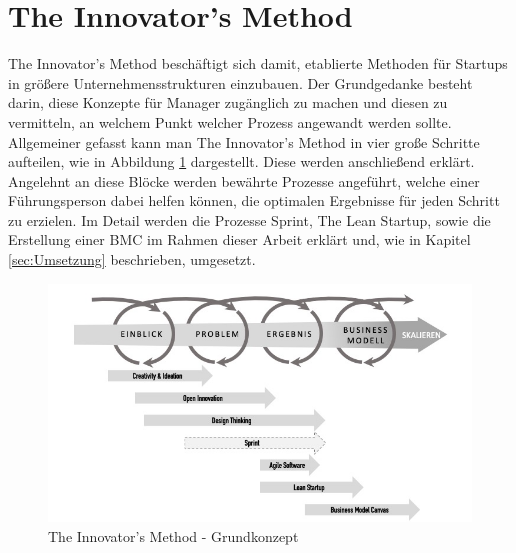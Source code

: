 \section{The Innovator's Method}
\label{sec:TheInnovatorsMethod}
The Innovator's Method beschäftigt sich damit, etablierte Methoden für Startups in größere Unternehmensstrukturen einzubauen. Der Grundgedanke besteht darin, diese Konzepte für Manager zugänglich zu machen und diesen zu vermitteln, an welchem Punkt welcher Prozess angewandt werden sollte. Allgemeiner gefasst kann man The Innovator's Method in vier große Schritte aufteilen, wie in Abbildung \ref{fig:TheInnovatorsMethod} dargestellt. Diese werden anschließend erklärt. Angelehnt an diese Blöcke werden bewährte Prozesse angeführt, welche einer Führungsperson dabei helfen können, die optimalen Ergebnisse für jeden Schritt zu erzielen.
Im Detail werden die Prozesse Sprint, The Lean Startup, sowie die Erstellung einer \ac{BMC} im Rahmen dieser Arbeit erklärt und, wie in Kapitel \ref{sec:Umsetzung} beschrieben, umgesetzt.

\begin{figure}[h!]
	\begin{center}
		\includegraphics[width=\textwidth]{99_IMG/02_Grundlagen/innovatorsMethod.jpg}
		\caption{The Innovator's Method - Grundkonzept}
		\label{fig:TheInnovatorsMethod}
	\end{center}
\end{figure}

